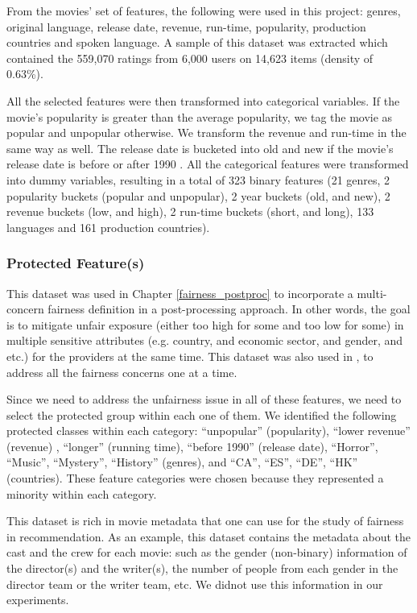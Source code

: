     From the movies' set of features, the following were used in this project: genres, original language, release date, revenue, run-time, popularity, production countries and spoken language. A sample of this dataset was extracted which contained the 559,070 ratings from 6,000 users on 14,623 items (density of 0.63\%).

    All the selected features were then transformed into categorical variables. If the movie's popularity is greater than the average popularity, we tag the movie as popular and unpopular otherwise. We transform the revenue and run-time in the same way as well. The release date is bucketed into old and new if the movie's release date is before or after 1990 \cite{kamishima2016model}. All the categorical features were transformed into dummy variables, resulting in a total of 323 binary features (21 genres, 2 popularity buckets (popular and unpopular), 2 year buckets (old, and new), 2 revenue buckets (low, and high), 2 run-time buckets (short, and long), 133 languages and 161 production countries).
    
        \subsubsection{Protected Feature(s)}

        This dataset was used in Chapter \ref{fairness_postproc}  to incorporate a multi-concern fairness definition in a post-processing approach. In other words, the goal is to mitigate unfair exposure (either too high for some and too low for some) in multiple sensitive attributes (e.g. country, and economic sector, and gender, and etc.) for the providers at the same time. This dataset was also used in , to address all the fairness concerns one at a time.
    
        Since we need to address the unfairness issue in all of these features, we need to select the protected group within each one of them.
        We identified the following protected classes within each category: ``unpopular'' (popularity), ``lower revenue'' (revenue) , ``longer'' (running time), ``before 1990'' (release date), ``Horror'', ``Music'', ``Mystery'', ``History'' (genres), and ``CA'', ``ES'', ``DE'', ``HK'' (countries). These feature categories were chosen because they represented a minority within each category.
    
        This dataset is rich in movie metadata that one can use for the study of fairness in recommendation. As an example, this dataset contains the metadata about the cast and the crew for each movie: such as the gender (non-binary) information of the director(s) and the writer(s), the number of people from each gender in the director team or the writer team, etc. We didnot use this information in our experiments.

